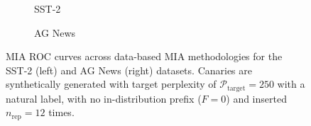 \begin{figure}[t]
    \centering
    \begin{subfigure}{0.4\textwidth}
        \centering
        \resizebox{\textwidth}{!}{}
        \caption{SST-2}
    \end{subfigure}
    \hspace{0.05\textwidth}
    \begin{subfigure}{0.4\textwidth}
        \centering
        \resizebox{\textwidth}{!}{}
        \caption{AG News}
    \end{subfigure}
    \caption{
        MIA ROC curves across data-based MIA methodologies for the SST-2 (left) and AG News (right) datasets.
        Canaries are synthetically generated with target perplexity of $\mathcal{P}_{\textrm{target}}=250$ with a natural label, with no in-distribution prefix ($F=0$) and inserted $n_\textrm{rep}=12$ times.
    }
\label{fig:results_primary}
\end{figure}
